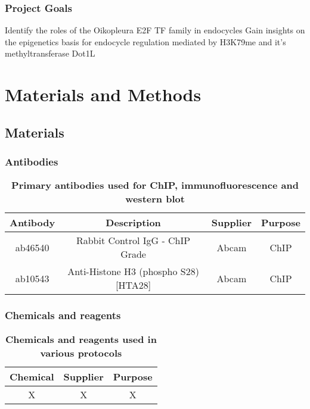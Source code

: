 \documentclass[11pt,twoside,a4paper]{report}
\begin{document}
		\subsection{Project Goals}
		Identify the roles of the Oikopleura E2F TF family in endocycles
		Gain insights on the epigenetics basis for endocycle regulation mediated by H3K79me and it's methyltransferase Dot1L

\clearpage

\chapter{Materials and Methods}
	\section{Materials}
		\subsection{Antibodies}
			\begin{table}[!ht]
       		\caption{
            		\bf{Primary antibodies used for ChIP, immunofluorescence and western blot}
        }
        		\begin{center}
            		\begin{tabular}{|c|c|c|c|}
                		\hline
	                Antibody & Description & Supplier & Purpose\\
    		            \hline
        		        ab46540 & Rabbit Control IgG - ChIP Grade & Abcam & ChIP\\
            		    ab10543 & Anti-Histone H3 (phospho S28) [HTA28] & Abcam & ChIP\\
	                \hline
	            \end{tabular}
    		    \end{center}
		    \end{table}
		  
		\subsection{Chemicals and reagents}
			\begin{table}[!ht]
       		\caption{
            		\bf{Chemicals and reagents used in various protocols}
        }
        		\begin{center}
            		\begin{tabular}{|c|c|c|}
                		\hline
	                Chemical & Supplier & Purpose\\
    		            \hline
        		        X & X & X\\
	                \hline
	            \end{tabular}
    		    \end{center}
		    \end{table}
    
\end{document}
